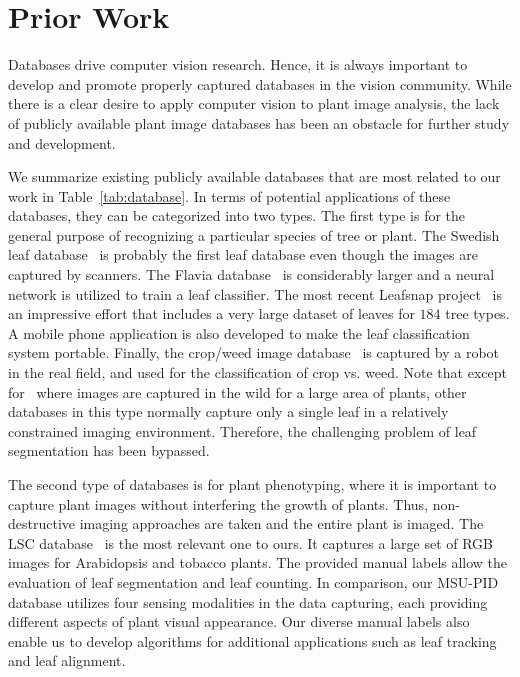 \section{Prior Work}
\label{sec:prior}

Databases drive computer vision research.
Hence, it is always important to develop and promote properly captured databases in the vision community.
While there is a clear desire to apply computer vision to plant image analysis, the lack of publicly available plant image databases has been an obstacle for further study and development.

We summarize existing publicly available databases that are most related to our work in Table~\ref{tab:database}.
In terms of potential applications of these databases, they can be categorized into two types.
The first type is for the general purpose of recognizing a particular species of tree or plant.
The Swedish leaf database~\cite{soderkvist2001computer} is probably the first leaf database even though the images are captured by scanners.
The Flavia database~\cite{wu2007leaf} is considerably larger and a neural network is utilized to train a leaf classifier.
The most recent Leafsnap project~\cite{kumar2012leafsnap} is an impressive effort that includes a very large dataset of leaves for $184$ tree types.
A mobile phone application is also developed to make the leaf classification system portable.
Finally, the crop/weed image database~\cite{haug2014crop} is captured by a robot in the real field, and used for the classification of crop vs. weed.
Note that except for~\cite{haug2014crop} where images are captured in the wild for a large area of plants, other databases in this type normally capture only a single leaf in a relatively constrained imaging environment.
Therefore, the challenging problem of leaf segmentation has been bypassed.

The second type of databases is for plant phenotyping, where it is important to capture plant images without interfering the growth of plants.
Thus, non-destructive imaging approaches are taken and the entire plant is imaged.
The LSC database~\cite{scharr2014annotated} is the most relevant one to ours.
It captures a large set of RGB images for Arabidopsis and tobacco plants.
The provided manual labels allow the evaluation of leaf segmentation and leaf counting.
In comparison, our MSU-PID database utilizes four sensing modalities in the data capturing, each providing different aspects of plant visual appearance.
Our diverse manual labels also enable us to develop algorithms for additional applications such as leaf tracking and leaf alignment.

